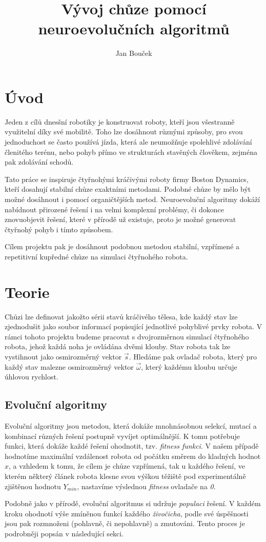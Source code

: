 \documentclass[a4]{article}
\begin{document}
\title{Vývoj chůze pomocí neuroevolučních algoritmů} 
\author{Jan Bouček} 
\date{} 
\maketitle 
 
\section{Úvod} 
Jeden z cílů dnesšní robotiky je konstruovat roboty, kteří jsou všestranně využitelní díky své mobilitě. Toho lze dosáhnout různými způsoby, pro svou jednoduchost se často používá jízda, která ale neumožňuje spolehlivé zdolávání členitého terénu, nebo pohyb přímo ve strukturách stavěných člověkem, zejména pak zdolávání schodů.\par
Tato práce se inspiruje čtyřnohými kráčivými roboty firmy Boston Dynamics\cite{bostondynamics}, kteří dosahují stabilní chůze exaktními metodami.\cite{bdpaper} Podobné chůze by mělo být možné dosáhnout i pomocí organičtějších metod. Neuroevoluční algoritmy dokáží nabídnout přirozené řešení i na velmi komplexní problémy, či dokonce znovuobjevit řešení, které v přírodě už existuje, proto je možné generovat čtyřnohý pohyb i tímto způsobem.\cite{clunegait}\par
Cílem projektu pak je dosáhnout podobnou metodou stabilní, vzpřímené a repetitivní kupředné chůze na simulaci čtyřnohého robota.
 
\section{Teorie}
Chůzi lze definovat jakožto sérii stavů kráčivého tělesa, kde každý stav lze zjednodušit jako soubor informací popisující jednotlivé pohyblivé prvky robota. V rámci tohoto projektu budeme pracovat s dvojrozměrnou simulací čtyřnohého robota, jehož každá noha je ovládána dvěmi klouby. Stav robota tak lze vystihnout jako osmirozměrný vektor $\vec{s}$. Hledáme pak ovladač robota, který pro každý stav malezne osmirozměrný vektor $\vec{\omega}$, který každému kloubu určuje úhlovou rychlost.
\subsection{Evoluční algoritmy}
Evoluční algoritmy jsou metodou, která dokáže mnohnásobnou selekcí, mutací a kombinací různých řešení postupně vyvíjet optimálnější. K tomu potřebuje funkci, která dokáže každé řešení ohodnotit, tzv. \emph{fitness funkci}. V našem případě hodnotíme maximální vzdálenost robota od počátku směrem do kladných hodnot $x$, a vzhledem k tomu, že cílem je chůze vzpřímená, tak u každého řešení, ve kterém některý článek robota klesne svou výškou těžiště pod experimentálně zjištěnou hodnotu $Y_{min}$, nastavíme výslednou \emph{fitness} ovladače na \emph{0}.\par
Podobně jako v přírodě, evoluční algoritmus si udržuje \emph{populaci} řešení. V každém kroku ohodnotí výše zmíněnou funkcí každého \emph{živočicha}, podle své úspěšnosti jsou pak rozmnoženi (pohlavně, či nepohlavně) a zmutováni. Tento proces je podrobněji popsán v následující sekci.
\end{document}
